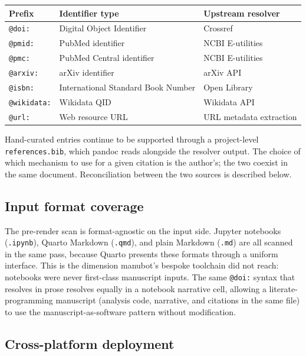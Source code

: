 \documentclass[
  letterpaper,
  DIV=11,
  numbers=noendperiod]{scrartcl}
\newcounter{none} %
\begin{document}
{\def\LTcaptype{none} %
\begin{longtable}[]{@{}lll@{}}
\toprule\noalign{}
Prefix & Identifier type & Upstream resolver \\
\midrule\noalign{}
\endhead
\bottomrule\noalign{}
\endlastfoot
\texttt{@doi:} & Digital Object Identifier & Crossref \\
\texttt{@pmid:} & PubMed identifier & NCBI E-utilities \\
\texttt{@pmc:} & PubMed Central identifier & NCBI E-utilities \\
\texttt{@arxiv:} & arXiv identifier & arXiv API \\
\texttt{@isbn:} & International Standard Book Number & Open Library \\
\texttt{@wikidata:} & Wikidata QID & Wikidata API \\
\texttt{@url:} & Web resource URL & URL metadata extraction \\
\end{longtable}
}

Hand-curated entries continue to be supported through a project-level
\texttt{references.bib}, which pandoc reads alongside the resolver
output. The choice of which mechanism to use for a given citation is the
author's; the two coexist in the same document. Reconciliation between
the two sources is described below.

\subsection{Input format coverage}\label{input-format-coverage}

The pre-render scan is format-agnostic on the input side. Jupyter
notebooks (\texttt{.ipynb}), Quarto Markdown (\texttt{.qmd}), and plain
Markdown (\texttt{.md}) are all scanned in the same pass, because Quarto
presents these formats through a uniform interface. This is the
dimension manubot's bespoke toolchain did not reach: notebooks were
never first-class manuscript inputs. The same \texttt{@doi:} syntax that
resolves in prose resolves equally in a notebook narrative cell,
allowing a literate-programming manuscript (analysis code, narrative,
and citations in the same file) to use the manuscript-as-software
pattern without modification.

\subsection{Cross-platform deployment}\label{cross-platform-deployment}
\end{document}
